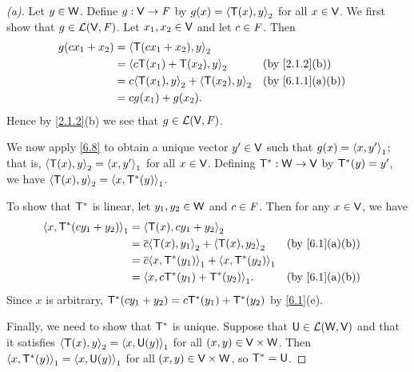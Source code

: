 \begin{proof}[(a)]
  Let \(y \in \mathsf{W}\).
  Define \(g : \mathsf{V} \to \mathit{F}\) by \(g(x) = \left\langle\mathsf{T}(x), y\right\rangle_2\) for all \(x \in \mathsf{V}\).
  We first show that \(g \in \mathcal{L}(\mathsf{V}, \mathit{F})\).
  Let \(x_1, x_2 \in \mathsf{V}\) and let \(c \in \mathit{F}\).
  Then
  \begin{align*}
    g(c x_1 + x_2) & = \inn{\T(c x_1 + x_2), y}_2                                     \\
                   & = \inn{c \T(x_1) + \T(x_2), y}_2            &  & \by{2.1.2}[b]   \\
                   & = c \inn{\T(x_1), y}_2 + \inn{\T(x_2), y}_2 &  & \by{6.1.1}[a,b] \\
                   & = c g(x_1) + g(x_2).
  \end{align*}
  Hence by \cref{2.1.2}(b) we see that \(g \in \mathcal{L}(\mathsf{V}, \mathit{F})\).

  We now apply \cref{6.8} to obtain a unique vector \(y' \in \mathsf{V}\) such that \(g(x) = \left\langle x, y'\right\rangle_1\);
  that is, \(\left\langle\mathsf{T}(x), y\right\rangle_2 = \left\langle x, y'\right\rangle_1\) for all \(x \in \mathsf{V}\).
  Defining \(\mathsf{T}^* : \mathsf{W} \to \mathsf{V}\) by \(\mathsf{T}^*(y) = y'\), we have \(\left\langle\mathsf{T}(x), y\right\rangle_2 = \left\langle x, \mathsf{T}^*(y)\right\rangle_1\).

  To show that \(\mathsf{T}^*\) is linear, let \(y_1, y_2 \in \mathsf{W}\) and \(c \in \mathit{F}\).
  Then for any \(x \in \mathsf{V}\),
  we have
  \begin{align*}
    \inn{x, \T^*(c y_1 + y_2)}_1 & = \inn{\T(x), c y_1 + y_2}_2                                              \\
                                 & = \conj{c} \inn{\T(x), y_1}_2 + \inn{\T(x), y_2}_2     &  & \by{6.1}[a,b] \\
                                 & = \conj{c} \inn{x, \T^*(y_1)}_1 + \inn{x, \T^*(y_2)}_1                    \\
                                 & = \inn{x, c \T^*(y_1) + \T^*(y_2)}_1.                  &  & \by{6.1}[a,b]
  \end{align*}
  Since \(x\) is arbitrary, \(\mathsf{T}^*(c y_1 + y_2) = c \mathsf{T}^*(y_1) + \mathsf{T}^*(y_2)\) by \cref{6.1}(e).

  Finally, we need to show that \(\mathsf{T}^*\) is unique. Suppose that \(\mathsf{U} \in \mathcal{L}(\mathsf{W}, \mathsf{V})\) and that it satisfies \(\left\langle\mathsf{T}(x), y\right\rangle_2 = \left\langle x, \mathsf{U}(y)\right\rangle_1\) for all \((x, y) \in \mathsf{V} \times \mathsf{W}\).
  Then \(\left\langle x, \mathsf{T}^*(y)\right\rangle_1 = \left\langle x, \mathsf{U}(y)\right\rangle_1\) for all \((x, y) \in \mathsf{V} \times \mathsf{W}\), so \(\mathsf{T}^* = \mathsf{U}\).
\end{proof}

